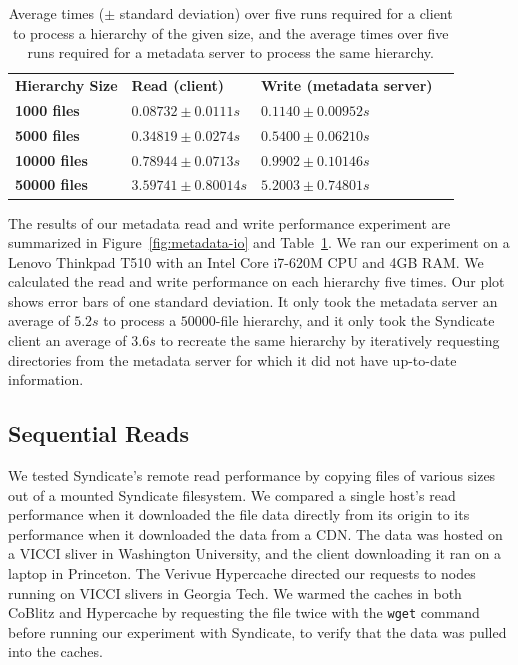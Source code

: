 \begin{table}[ht!]
\begin{tabular}{ | l | l | l | l | }
\hline
\textbf{Hierarchy Size} & \textbf{Read (client)} & \textbf{Write (metadata server)} \\
\textbf{1000 files} & $0.08732\pm0.0111s$ & $0.1140\pm0.00952s$ \\
\textbf{5000 files} & $0.34819\pm0.0274s$ & $0.5400\pm0.06210s$ \\
\textbf{10000 files} & $0.78944\pm0.0713s$ & $0.9902\pm0.10146s$ \\
\textbf{50000 files} & $3.59741\pm0.80014s$ & $5.2003\pm0.74801s$ \\
\hline
\end{tabular}
\caption{Average times ($\pm$ standard deviation) over five runs required for a client to process a hierarchy
of the given size, and the average times over five runs required for a metadata server to process the same hierarchy.}
\label{tab:metadata-io-table}
\end{table}

The results of our metadata read and write performance experiment are summarized in Figure~\ref{fig:metadata-io} and Table~\ref{tab:metadata-io-table}.
We ran our experiment on a Lenovo Thinkpad T510 with an Intel Core i7-620M CPU and 4GB RAM.  We calculated the
read and write performance on each hierarchy five times.  Our plot shows error bars of one standard deviation.
It only took the metadata server an average of $5.2s$ to process a $50000$-file hierarchy, and it only
took the Syndicate client an average of $3.6s$ to recreate the same hierarchy by iteratively requesting
directories from the metadata server for which it did not have up-to-date information.

\subsection{Sequential Reads}

We tested Syndicate's remote read performance by copying files of various sizes out of
a mounted Syndicate filesystem.  We compared a single host's read performance when it 
downloaded the file data directly from its origin to its performance when it downloaded
the data from a CDN.  The data was hosted on a VICCI sliver in Washington University, 
and the client downloading it ran on a laptop in Princeton.  The Verivue Hypercache
directed our requests to nodes running on VICCI slivers in Georgia Tech.  We warmed
the caches in both CoBlitz and Hypercache by requesting the file twice with 
the \texttt{wget} command before running our experiment with Syndicate, to verify
that the data was pulled into the caches.

